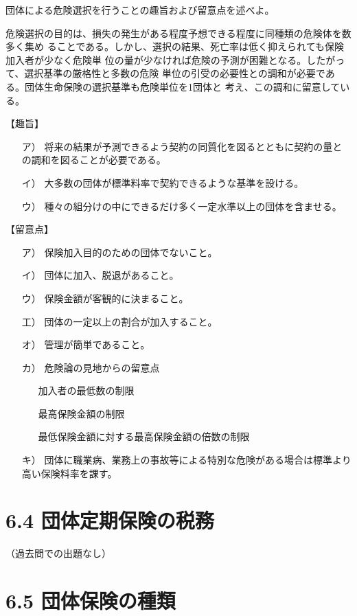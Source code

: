 \documentclass[report,gutter=10mm,fore-edge=10mm,uplatex,dvipdfmx]{jlreq}
\begin{document}
団体による危険選択を行うことの趣旨および留意点を述べよ。
\answer{}

危険選択の目的は、損失の発生がある程度予想できる程度に同種類の危険体を数多く集め
ることである。しかし、選択の結果、死亡率は低く抑えられても保険加入者が少なく危険単
位の量が少なければ危険の予測が困難となる。したがって、選択基準の厳格性と多数の危険
単位の引受の必要性との調和が必要である。団体生命保険の選択基準も危険単位を1団体と
考え、この調和に留意している。

【趣旨】

\begin{itemize}
\item[ ア）] 将来の結果が予測できるよう契約の同質化を図るとともに契約の量との調和を図ることが必要である。
\item[ イ）] 大多数の団体が標準料率で契約できるような基準を設ける。
\item[ ウ）] 種々の組分けの中にできるだけ多く一定水準以上の団体を含ませる。
\end{itemize}

【留意点】

\begin{itemize}
\item[ ア）] 保険加入目的のための団体でないこと。
\item[ イ）] 団体に加入、脱退があること。
\item[ ウ）] 保険金額が客観的に決まること。
\item[ 工）] 団体の一定以上の割合が加入すること。
\item[ オ）] 管理が簡単であること。
\item[ カ）] 危険論の見地からの留意点
\begin{itemize}
 \item[ ] 加入者の最低数の制限
 \item[ ] 最高保険金額の制限
 \item[ ] 最低保険金額に対する最高保険金額の倍数の制限
\end{itemize}
\item[ キ）] 団体に職業病、業務上の事故等による特別な危険がある場合は標準より高い保険料率を課す。
\end{itemize}

\section{6.4 団体定期保険の税務}
（過去問での出題なし）

\section{6.5 団体保険の種類}
\end{document}
